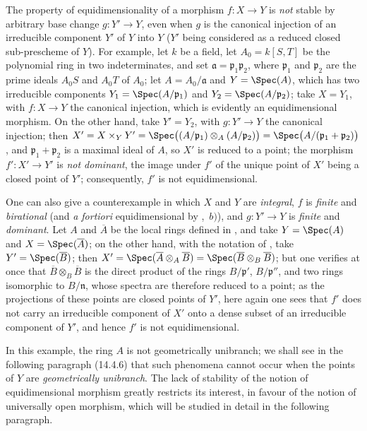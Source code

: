 \begin{remarks}[13.3.9]
\label{IV.13.3.9}
The property of equidimensionality of a morphism $f:X\to Y$ is \emph{not} stable by arbitrary base change $g:Y'\to Y$, even when $g$ is the canonical injection of an irreducible component $Y'$ of $Y$ into $Y$ ($Y'$ being
considered as a reduced closed sub-prescheme of $Y$).
For example, let $k$ be a field, let $A_0=k[S,T]$ be the polynomial ring in two indeterminates, and set $\mathfrak{a}=\mathfrak{p}_1\mathfrak{p}_2$, where $\mathfrak{p}_1$ and $\mathfrak{p}_2$ are the prime ideals $A_0S$ and $A_0T$ of $A_0$; let $A=A_0/\mathfrak{a}$ and $Y=\Spec(A)$, which has two irreducible components $Y_1=\Spec(A/\mathfrak{p}_1)$ and $Y_2=\Spec(A/\mathfrak{p}_2)$; take $X=Y_1$, with $f:X\to Y$ the canonical injection, which is evidently an equidimensional morphism.
On the other hand, take $Y'=Y_2$, with $g:Y'\to Y$ the canonical injection; then $X'=X\times_Y Y'=\Spec\bigl((A/\mathfrak{p}_1)\otimes_A(A/\mathfrak{p}_2)\bigr)=\Spec\bigl(A/(\mathfrak{p}_1+\mathfrak{p}_2)\bigr)$, and $\mathfrak{p}_1+\mathfrak{p}_2$ is a maximal ideal of $A$, so $X'$ is reduced to a point; the morphism $f':X'\to Y'$ is \emph{not dominant}, the image under $f'$ of the unique point of $X'$ being a closed point of $Y'$; consequently, $f'$ is not equidimensional.

One can also give a counterexample in which $X$ and $Y$ are \emph{integral}, $f$ is \emph{finite} and \emph{birational} (and \emph{a fortiori} equidimensional by ,~$b)$), and $g:Y'\to Y$ is \emph{finite} and \emph{dominant}.
Let $A$ and $\overline{A}$ be the local rings defined in , and take $Y=\Spec(A)$ and $X=\Spec(\overline{A})$; on the other hand, with the notation of , take $Y'=\Spec(\overline{B})$; then $X'=\Spec(\overline{A}\otimes_A\overline{B})=\Spec(\overline{B}\otimes_B\overline{B})$; but one verifies at once that $\overline{B}\otimes_B\overline{B}$ is the direct product of the rings $B/\mathfrak{p}'$, $B/\mathfrak{p}''$, and two rings isomorphic to $B/\mathfrak{n}$, whose spectra are therefore reduced to a point; as the projections of these points are closed points of $Y'$, here again one sees that $f'$ does not carry an irreducible component of $X'$ onto a dense subset of an irreducible component of $Y'$, and hence $f'$ is not equidimensional.

In this example, the ring $A$ is not geometrically unibranch; we shall see in the following paragraph (14.4.6) that such phenomena cannot occur when the points of $Y$ are \emph{geometrically unibranch}.
The lack of stability of the notion of equidimensional morphism greatly restricts its interest, in favour of the notion of universally open morphism, which will be studied in detail in the following paragraph.
\end{remarks}
